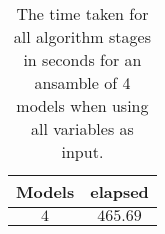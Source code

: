 \begin{table}[!ht]
	\centering
	\begin{tabular}{|c|c|}
		\hline
		Models & elapsed \\ \hline
		$4$ & $465.69$ \\ \hline
	\end{tabular}
	\caption{The time taken for all algorithm stages in seconds for an ansamble of 4 models when using all variables as input.}
	\label{tab:time:ansamble:all:4}
\end{table}

